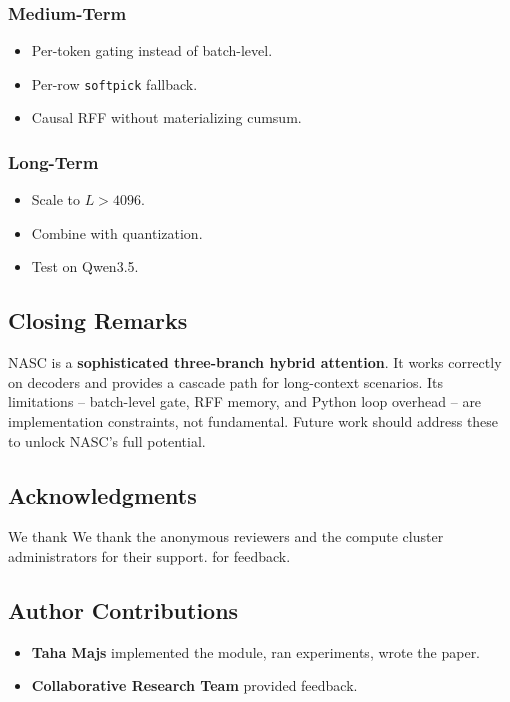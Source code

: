 \subsubsection{Medium-Term}

\begin{itemize}
\item Per-token gating instead of batch-level.
\item Per-row \texttt{softpick} fallback.
\item Causal RFF without materializing cumsum.

\end{itemize}
\subsubsection{Long-Term}

\begin{itemize}
\item Scale to $L > 4096$.
\item Combine with quantization.
\item Test on Qwen3.5.

\end{itemize}
\subsection{Closing Remarks}

NASC is a \textbf{sophisticated three-branch hybrid attention}. It works 
correctly on decoders and provides a cascade path for long-context 
scenarios. Its limitations -- batch-level gate, RFF memory, and Python loop 
overhead -- are implementation constraints, not fundamental. Future work 
should address these to unlock NASC's full potential.

\subsection{Acknowledgments}

We thank We thank the anonymous reviewers and the compute cluster administrators for their support. for feedback.

\subsection{Author Contributions}

\begin{itemize}
\item \textbf{Taha Majs} implemented the module, ran experiments, wrote the paper.
\item \textbf{Collaborative Research Team} provided feedback.

\end{itemize}
